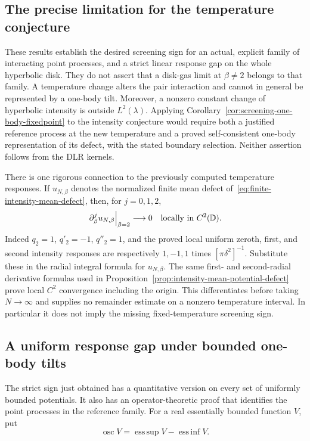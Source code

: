 \documentclass[11pt,a4paper]{article}
\numberwithin{equation}{section}
\theoremstyle{definition}
\theoremstyle{remark}
\newcommand{\D}{\mathbb D}
\begin{document}
\subsection{The precise limitation for the temperature conjecture}

These results establish the desired screening sign for an actual,
explicit family of interacting point processes, and a strict linear
response gap on the whole hyperbolic disk.  They do not assert that a
disk-gas limit at $\beta\ne2$ belongs to that family.  A temperature
change alters the pair interaction and cannot in general be represented
by a one-body tilt.  Moreover, a nonzero constant change of hyperbolic
intensity is outside $L^2(\lambda)$.  Applying
Corollary~\ref{cor:screening-one-body-fixedpoint} to the intensity
conjecture would require both a justified reference process at the new
temperature and a proved self-consistent one-body representation of its
defect, with the stated boundary selection.  Neither assertion follows
from the DLR kernels.

There is one rigorous connection to the previously computed temperature
responses.  If $u_{N,\beta}$ denotes the normalized finite mean defect
of~\eqref{eq:finite-intensity-mean-defect}, then, for $j=0,1,2$,
\begin{equation}
 \left.\partial_\beta^j u_{N,\beta}\right|_{\beta=2}
          \longrightarrow0\quad\hbox{locally in }C^2(\D).
 \label{eq:screening-mean-defect-second-order-flatness}
\end{equation}
Indeed $q_2=1$, $q'_2=-1$, $q''_2=1$, and the proved local uniform
zeroth, first, and second intensity responses are respectively
$1,-1,1$ times $[\pi\delta^2]^{-1}$.  Substitute these in the radial
integral formula for $u_{N,\beta}$.  The same first- and second-radial
derivative formulas used in
Proposition~\ref{prop:intensity-mean-potential-defect} prove local
$C^2$ convergence including the origin.  This differentiates before
taking $N\to\infty$ and supplies no remainder estimate on a nonzero
temperature interval.  In particular it does not imply the missing
fixed-temperature screening sign.


\subsection{A uniform response gap under bounded one-body tilts}
\label{subsec:screening-uniform-berezin-tilts}

The strict sign just obtained has a quantitative version on every set
of uniformly bounded potentials.  It also has an operator-theoretic
proof that identifies the point processes in the reference family.
For a real essentially bounded function $V$, put
\[
 \operatorname{osc}V=\operatorname*{ess\,sup}V-
                         \operatorname*{ess\,inf}V.
\]
\end{document}

